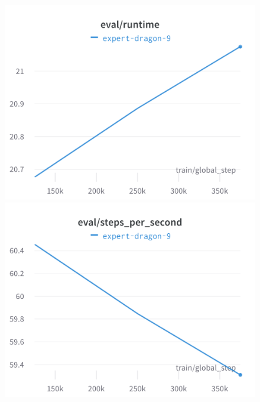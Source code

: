 \documentclass{article}
\begin{document}
\begin{figure}[!htb]
\includegraphics[width=\linewidth]{charts/Section-2-Panel-2-rf7w3ahn0}
\caption{}
\endminipage\hfill
{}
\includegraphics[width=\linewidth]{charts/Section-2-Panel-3-dwr29svyg}
\caption{}
\endminipage
\end{figure}
\end{document}
